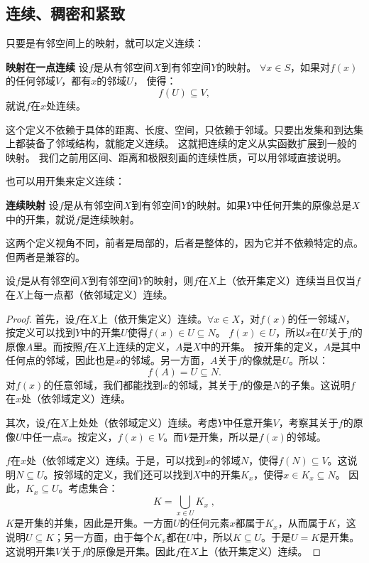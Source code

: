 \documentclass[12pt,UTF8]{ctexbook}
\begin{document}
\begin{appendix}
\section{连续、稠密和紧致}

只要是有邻空间上的映射，就可以定义连续：
\begin{df}{\textbf{映射在一点连续}}
    设$f$是从有邻空间$X$到有邻空间$Y$的映射。
    $\forall x\in S$，如果对$f(x)$的任何邻域$V$，都有$x$的邻域$U$，
    使得：
    $$ f(U) \subseteq V,$$
    就说$f$在$x$处连续。
\end{df}
这个定义不依赖于具体的距离、长度、空间，只依赖于邻域。只要出发集和到达集上都装备了邻域结构，就能定义连续。
这就把连续的定义从实函数扩展到一般的映射。
我们之前用区间、距离和极限刻画的连续性质，可以用邻域直接说明。

也可以用开集来定义连续：
\begin{df}{\textbf{连续映射}}
    设$f$是从有邻空间$X$到有邻空间$Y$的映射。如果$Y$中任何开集的原像总是$X$中的开集，就说$f$是连续映射。
\end{df}

这两个定义视角不同，前者是局部的，后者是整体的，因为它并不依赖特定的点。但两者是兼容的。

\begin{tm}\label{tm:a-3-0}
    设$f$是从有邻空间$X$到有邻空间$Y$的映射，则$f$在$X$上（依开集定义）连续当且仅当$f$在$X$上每一点都（依邻域定义）连续。
\end{tm}

\begin{proof}
    首先，设$f$在$X$上（依开集定义）连续。$\forall x \in X$，对$f(x)$的任一邻域$N$，按定义可以找到$Y$中的开集$U$使得$f(x)\in U\subseteq N$。
    $f(x)\in U$，所以$x$在$U$关于$f$的原像$A$里。而按照$f$在$X$上连续的定义，$A$是$X$中的开集。
    按开集的定义，$A$是其中任何点的邻域，因此也是$x$的邻域。另一方面，$A$关于$f$的像就是$U$。所以：
    $$ f(A) = U \subseteq N. $$
    对$f(x)$的任意邻域，我们都能找到$x$的邻域，其关于$f$的像是$N$的子集。这说明$f$在$x$处（依邻域定义）连续。

    其次，设$f$在$X$上处处（依邻域定义）连续。考虑$Y$中任意开集$V$，考察其关于$f$的原像$U$中任一点$x$。按定义，$f(x)\in V$。而$V$是开集，所以是$f(x)$的邻域。
    
    $f$在$x$处（依邻域定义）连续。于是，可以找到$x$的邻域$N$，使得$f(N) \subseteq V$。这说明$N\subseteq U$。按邻域的定义，我们还可以找到$X$中的开集$K_x$，使得$x\in K_x\subseteq N$。
    因此，$K_x\subseteq U$。考虑集合：
    $$K = \bigcup_{x\in U} K_x\; ,$$
    $K$是开集的并集，因此是开集。一方面$U$的任何元素$x$都属于$K_x$，从而属于$K$，这说明$U\subseteq K$；另一方面，由于每个$K_x$都在$U$中，所以$K\subseteq U$。于是$U = K$是开集。
    这说明开集$V$关于$f$的原像是开集。因此$f$在$X$上（依开集定义）连续。


\end{proof}
\end{appendix}
\end{document}
